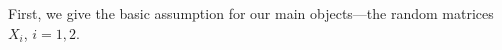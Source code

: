 







\iffalse
First, we give the basic assumption for our main objects---the random matrices $X_i$, $i=1,2$.

